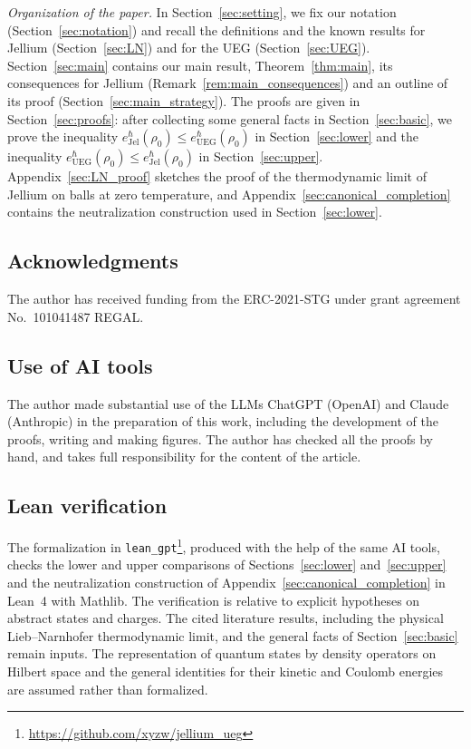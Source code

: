 \documentclass[final,reqno]{amsart}
\theoremstyle{remark}
\theoremstyle{definition}
\renewcommand{\le}{\leqslant}
\newcommand{\UEG}{\mathrm{UEG}}
\newcommand{\Jel}{\mathrm{Jel}}
\begin{document}
\noindent\emph{Organization of the paper.} In Section~\ref{sec:setting}, we fix our notation (Section~\ref{sec:notation}) and recall the definitions and the known results for Jellium (Section~\ref{sec:LN}) and for the UEG (Section~\ref{sec:UEG}). Section~\ref{sec:main} contains our main result, Theorem~\ref{thm:main}, its consequences for Jellium (Remark~\ref{rem:main_consequences}) and an outline of its proof (Section~\ref{sec:main_strategy}). The proofs are given in Section~\ref{sec:proofs}: after collecting some general facts in Section~\ref{sec:basic}, we prove the inequality $e^\hbar_\Jel(\rho_0)\le e^\hbar_\UEG(\rho_0)$ in Section~\ref{sec:lower} and the inequality $e^\hbar_\UEG(\rho_0)\le e^\hbar_\Jel(\rho_0)$ in Section~\ref{sec:upper}. Appendix~\ref{sec:LN_proof} sketches the proof of the thermodynamic limit of Jellium on balls at zero temperature, and Appendix~\ref{sec:canonical_completion} contains the neutralization construction used in Section~\ref{sec:lower}.

\subsection*{Acknowledgments}
The author has received funding from the ERC-2021-STG under grant agreement No.~101041487 REGAL.

\subsection*{Use of AI tools}
The author made substantial use of the LLMs ChatGPT (OpenAI) and Claude (Anthropic) in the preparation of this work, including the development of the proofs, writing and making figures. The author has checked all the proofs by hand, and takes full responsibility for the content of the article.

\subsection*{Lean verification}
The formalization in \texttt{lean\_gpt}\footnote{\url{https://github.com/xyzw/jellium_ueg}}, produced with the help of the same AI tools, checks the lower and upper comparisons of Sections~\ref{sec:lower} and~\ref{sec:upper} and the neutralization construction of Appendix~\ref{sec:canonical_completion} in Lean~4 with Mathlib.
The verification is relative to explicit hypotheses on abstract states and charges. The cited literature results, including the physical Lieb--Narnhofer thermodynamic limit, and the general facts of Section~\ref{sec:basic} remain inputs. The representation of quantum states by density operators on Hilbert space and the general identities for their kinetic and Coulomb energies are assumed rather than formalized.
\end{document}
